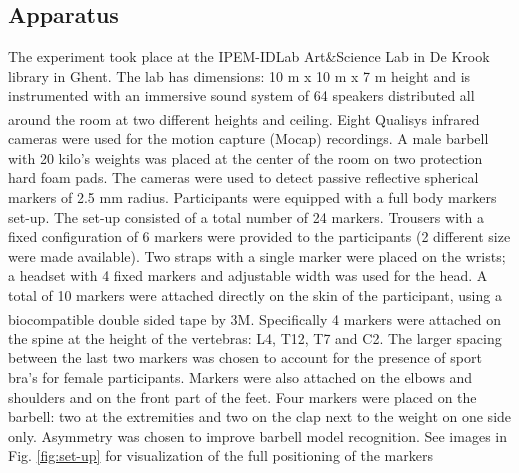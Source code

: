 \documentclass[10pt,letterpaper]{article}
\begin{document}
\subsection*{Apparatus}\label{sec:apparatus}
The experiment took place at the IPEM-IDLab Art\&Science Lab in De Krook library in Ghent. The lab has dimensions: 10 m x 10 m x 7 m height and is instrumented with an immersive sound system of 64 speakers distributed all around the room at two different heights and ceiling. Eight Qualisys\textsuperscript{\textregistered} infrared cameras were used for the motion capture (Mocap) recordings. 
A male barbell with 20 kilo's weights was placed at the center of the room on two protection hard foam pads.
The cameras were used to detect passive reflective spherical markers of 2.5 mm radius.
Participants were equipped with a full body markers set-up. The set-up consisted of a total number of 24 markers. Trousers with a fixed configuration of 6 markers were provided to the participants (2 different size were made available). Two straps with a single marker were placed on the wrists; a headset with 4 fixed markers and adjustable width was used for the head. A total of 10 markers were attached directly on the skin of the participant, using a biocompatible double sided tape by 3M\textsuperscript{\textregistered}. Specifically 4 markers were attached on the spine at the height of the vertebras: L4, T12, T7 and C2. The larger spacing between the last two markers was chosen to account for the presence of sport bra's for female participants. Markers were also attached on the elbows and shoulders and on the front part of the feet. 
Four markers were placed on the barbell: two at the extremities and two on the clap next to the weight on one side only. Asymmetry was chosen to improve barbell model recognition. 
See images in Fig. \ref{fig:set-up} for visualization of the full positioning of the markers
\end{document}
